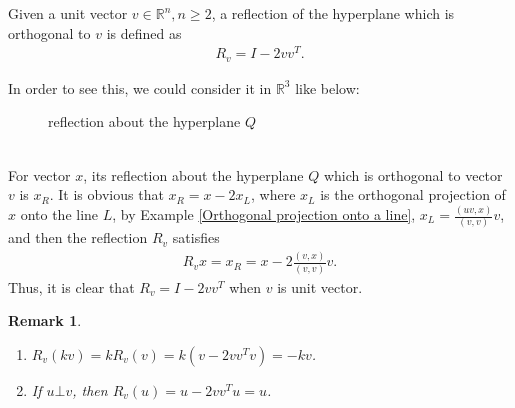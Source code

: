 \documentclass[11pt]{book}
\newtheorem{remark}{Remark}[chapter]
\theoremstyle{definition}
\numberwithin{equation}{chapter}
\begin{document}
\begin{subappendices}
Given a unit vector $v \in \mathbb{R}^n, n \geq 2$, a reflection of the hyperplane which is orthogonal to $v$ is defined as 
\begin{align*}
    R_v = I - 2 v v^T.
\end{align*}

In order to see this, we could consider it in $\mathbb{R}^3$ like below:\\
\begin{figure}[h]
    \centering
    \caption{reflection about the hyperplane $Q$}
    \label{fig:plot_2}
\end{figure}\\
For vector $x$, its reflection about the hyperplane $Q$ which is orthogonal to vector $v$ is $x_R$. It is obvious that $x_R = x - 2 x_L$, where $x_L$ is the orthogonal projection of $x$ onto the line $L$, by Example \ref{Orthogonal projection onto a line}, $x_L = \frac{(uv,x)}{(v,v)}v$, and then the reflection $R_v$ satisfies
\begin{align*}
    R_v x = x_R = x - 2 \frac{(v,x)}{(v,v)}v.
\end{align*}
Thus, it is clear that $R_v = I - 2 v v^T$ when $v$ is unit vector. 

\begin{remark}
~\begin{enumerate}[label=(\arabic*)]
    \item $R_v(kv) = k R_v(v) = k (v - 2 v v^T v) = -kv$.
    
    \item If $u \bot v$, then $R_v(u) = u - 2 v v^T u = u$.
\end{enumerate}
\end{remark}


\end{subappendices}
\end{document}
